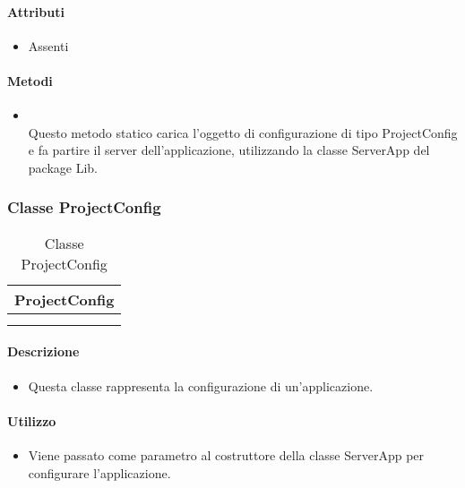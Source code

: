 \paragraph*{Attributi}
\begin{itemize}
\item[] Assenti
\end{itemize}

\paragraph*{Metodi}
\begin{itemize}
\item[]  \\ Questo metodo statico carica l'oggetto di configurazione di tipo ProjectConfig e fa partire il server dell'applicazione, utilizzando la classe ServerApp del package Lib.
\end{itemize}

\subsubsection{Classe ProjectConfig}

\begin{table}[ht]
\begin{center}
\bgroup
\setlength{\arrayrulewidth}{0.6mm}
\def\arraystretch{1}
\begin{tabular}{ | p{12cm} | }
\hline
\centerline{\textbf{ProjectConfig}}
\\ \hline
 \\ 
\hline
 \\ 
\hline
\end{tabular}
\egroup
\caption{Classe ProjectConfig}
\end{center}
\end{table}

\paragraph*{Descrizione}
\begin{itemize}
\item[] Questa classe rappresenta la configurazione di un'applicazione.
\end{itemize}

\paragraph*{Utilizzo}
\begin{itemize}
\item[] Viene passato come parametro al costruttore della classe ServerApp per configurare l'applicazione.
\end{itemize}

